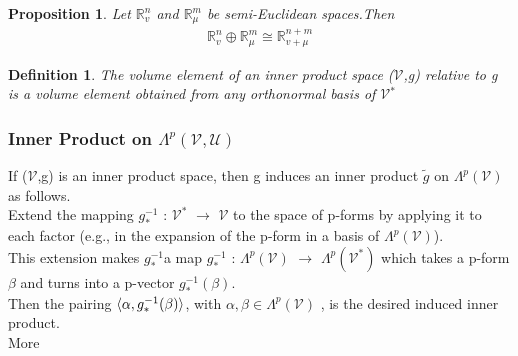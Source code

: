 \documentclass[12pt,a4paper]{article}
\newtheorem{defn}[thm]{Definition}
\newtheorem{prop}{Proposition}
\begin{document}
\begin{prop}
Let $\mathbb{R}^n_v$ and $\mathbb{R}^m_\mu$ be semi-Euclidean spaces.Then
\begin{eqnarray*}
\mathbb{R}^n_v \oplus \mathbb{R}^m_\mu \cong \mathbb{R}^{n+m}_{v + \mu}
\end{eqnarray*}
\end{prop}
\begin{defn}
The volume element of an inner product space ($\mathcal{V}$,g)
relative to g is a volume element obtained from any orthonormal basis
of $\mathcal{V}$$^*$
\end{defn}
\subsubsection{Inner Product on $\Lambda^{p}(\mathcal{V}, \mathcal{U})$}
If ($\mathcal{V}$,g) is an inner product space, then g induces an inner product $\widetilde{g}$ on $\Lambda^{p}(\mathcal{V})$ as follows. \\Extend the mapping $g_*^{-1}$ : $\mathcal{V}^*$ $\to$ $\mathcal{V}$ to the space of p-forms by applying it to each factor (e.g., in the expansion of the p-form in a
basis of $\Lambda^{p}(\mathcal{V})$).\\ This extension makes $g_*^{-1}$a map $g_*^{-1}$ : $\Lambda^{p}(\mathcal{V})$ $\to$ $\Lambda^{p}(\mathcal{V}^*)$ which takes a p-form $\beta$ and turns into a p-vector $g_*^{-1} (\beta)$. \\Then the pairing $\braket{\alpha, g_*^{-1}(\beta)}$, with $\alpha, \beta \in \Lambda^{p}(\mathcal{V})$ , is the desired induced inner product. \\More
\end{document}
